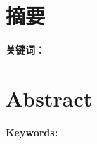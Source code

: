 \chapter*{摘要}
\ChineseAbstract

\medskip
\noindent\textbf{关键词：}\ChineseKeywords

\clearpage
\chapter*{Abstract}
\begin{center}
  {\Large\bfseries \EnglishTitle\par}
  \medskip
  {\EnglishAuthor\par}
  {\EnglishAffiliation\par}
\end{center}
\medskip
\EnglishAbstract

\medskip
\noindent\textbf{Keywords: }\EnglishKeywords

\clearpage
